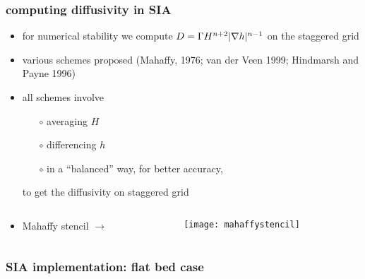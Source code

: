 \begin{frame}
  \frametitle{computing diffusivity in SIA}

\begin{itemize}
\item for numerical stability we compute $D = \Gamma H^{n+2} |\nabla h|^{n-1}$ on the staggered grid
\item various schemes proposed \small (Mahaffy, 1976\nocite{Mahaffy}; van der Veen 1999\nocite{vanderVeen}; Hindmarsh and Payne 1996\nocite{HindmarshPayne})
\item all schemes involve
  \begin{itemize}
  \item[$\circ$] averaging $H$
  \item[$\circ$] differencing $h$
  \item[$\circ$] in a ``balanced'' way, for better accuracy,
  \end{itemize}
to get the diffusivity on staggered grid
\end{itemize}

\begin{columns}
\begin{column}{0.65\textwidth}
\begin{itemize}
\item Mahaffy stencil \large $\to$ \normalsize
\end{itemize}
\end{column}

\begin{column}{0.35\textwidth}
  \texttt{[image: mahaffystencil]}
\end{column}
\end{columns}
\end{frame}


\begin{frame}
  \frametitle{SIA implementation: flat bed case}


\end{frame}


